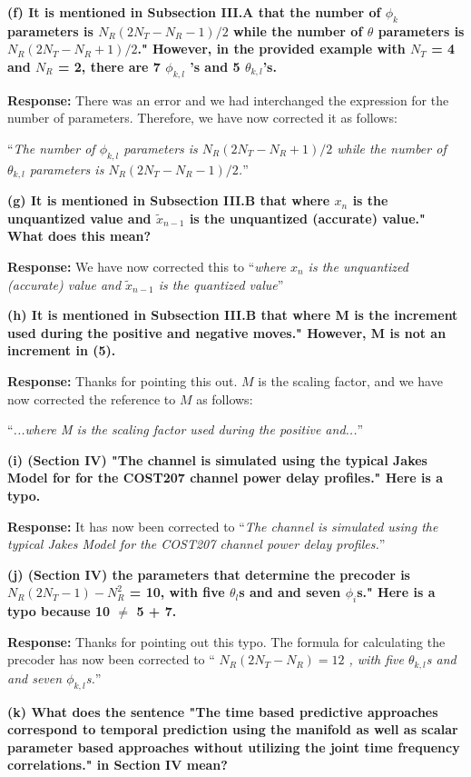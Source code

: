 \documentclass[12pt]{letter}
\begin{document}
\textbf{(f) It is mentioned in Subsection III.A that the number of
  $\phi_k$ parameters is $N_R(2N_T - N_R -1 )/2$ while the number of
  $\theta$ parameters is $N_R(2N_T -N_R + 1)/2$." However, in the
  provided example with $N_T$ = 4 and $N_R$ = 2, there are 7
  $\phi_{k,l}$ 's and 5 $\theta_{k,l}$'s.}

\textbf{Response:} There was an error and we had interchanged the
expression for the number of parameters. Therefore, we have now
corrected it as follows:

``\emph{The number of $\phi_{k,l}$ parameters is
  $N_{R}(2N_{T} - N_{R}+1)/2$ while the number of $\theta_{k,l}$
  parameters is $N_{R}(2N_{T} - N_{R}-1)/2$.}''

\textbf{(g) It is mentioned in Subsection III.B that where $x_n$ is the unquantized value and $\tilde{x}_{n-1}$ is the unquantized (accurate) value." What does this mean?}

\textbf{Response:} We have now corrected this to ``\emph{where $x_n$ is
  the unquantized (accurate) value and $\tilde{x}_{n-1}$ is the
  quantized value}''

\textbf{(h) It is mentioned in Subsection III.B that where M is the increment used during the positive and negative moves." However, M is not an increment in (5).}

\textbf{Response:} Thanks for pointing this out. $M$ is the scaling
factor, and we have now corrected the reference to $M$ as follows:

``\emph{...where M is the scaling factor used during the positive and...}''


\textbf{(i) (Section IV) "The channel is simulated using the typical Jakes Model for for the COST207 channel power delay profiles." Here is a typo.}

\textbf{Response:} It has now been corrected to ``\emph{The channel is simulated using the typical Jakes Model for the COST207 channel power delay profiles.}''

\textbf{(j) (Section IV) the parameters that determine the precoder is $N_R (2N_T - 1) - N^{2}_R$ = 10, with five $\theta_l$s and and seven $\phi_i$s." Here is a typo because 10 $\neq$ 5 + 7.}

\textbf{Response:} Thanks for pointing out this typo. The formula for
calculating the precoder has now been corrected to ``\emph{
  $N_{R}(2N_{T} - N_R) = 12$ , with five $\theta_{k,l}$s and and seven
  $\phi_{k,l}$s.}''

\textbf{(k) What does the sentence "The time based predictive approaches correspond to temporal prediction using the manifold as well as scalar parameter based approaches without utilizing the joint time frequency correlations." in Section IV mean?}
\end{document}
